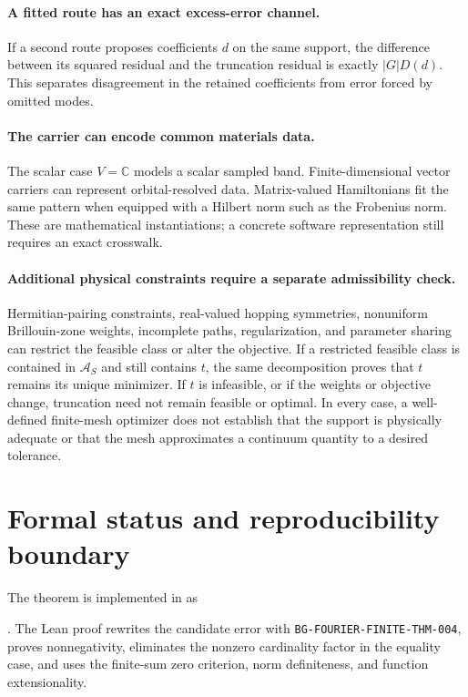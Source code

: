 \documentclass[11pt]{article}
\begin{document}
\paragraph{A fitted route has an exact excess-error channel.}
If a second route proposes coefficients $d$ on the same support, the difference between its squared
residual and the truncation residual is exactly $|G|D(d)$.  This separates disagreement in the
retained coefficients from error forced by omitted modes.

\paragraph{The carrier can encode common materials data.}
The scalar case $V=\mathbb C$ models a scalar sampled band.  Finite-dimensional vector carriers can
represent orbital-resolved data.  Matrix-valued Hamiltonians fit the same pattern when equipped
with a Hilbert norm such as the Frobenius norm.  These are mathematical instantiations; a concrete
software representation still requires an exact crosswalk.

\paragraph{Additional physical constraints require a separate admissibility check.}
Hermitian-pairing constraints, real-valued hopping symmetries, nonuniform Brillouin-zone weights,
incomplete paths, regularization, and parameter sharing can restrict the feasible class or alter
the objective.  If a restricted feasible class is contained in $\mathcal A_S$ and still contains
$t$, the same decomposition proves that $t$ remains its unique minimizer.  If $t$ is infeasible, or
if the weights or objective change, truncation need not remain feasible or optimal.  In every
case, a well-defined finite-mesh optimizer does not establish that the support is physically
adequate or that the mesh approximates a continuum quantity to a desired tolerance.

\section{Formal status and reproducibility boundary}
The theorem is implemented in
 as
\par\noindent
{}.
The Lean proof rewrites the candidate error with
\texttt{BG-FOURIER-FINITE-THM-004}, proves nonnegativity, eliminates the nonzero cardinality factor
in the equality case, and uses the finite-sum zero criterion, norm definiteness, and function
extensionality.
\end{document}
